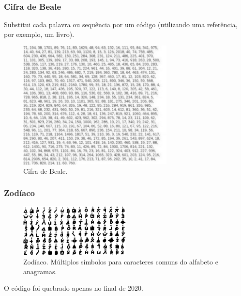 \begin{frame}
\frametitle{Cifra de Beale}
Substitui cada palavra ou sequência por um código (utilizando uma referência, por exemplo, um livro).

\begin{figure}[h]
\centering
\includegraphics[width=0.7\textwidth,height=0.5\textheight,keepaspectratio]{figures/beale.jpg}
\caption{Cifra de Beale.}
\label{fig-beale}
\end{figure}

\end{frame}






\begin{frame}[allowframebreaks]
\frametitle{Zodíaco}

\begin{figure}[h]
\centering
\includegraphics[width=0.5\textwidth,height=0.5\textheight,keepaspectratio]{figures/zodiaccipher.png}
\caption{Zodíaco. Múltiplos símbolos para caracteres comuns do alfabeto e anagramas.}
\label{fig-zodiac}
\end{figure}

O código foi quebrado apenas no final de 2020.\\
\vspace{2ex}

\end{frame}


